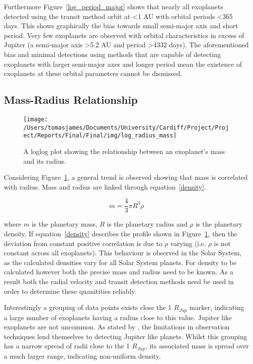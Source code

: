 \documentclass{report}
\begin{document}
Furthermore Figure~\ref{log_period_major} shows that nearly all exoplanets detected using the transit method orbit at \textless 1 AU with orbital periods \textless 365 days. This shows graphically the bias towards small semi-major axis and short period. Very few exoplanets are observed with orbital characteristics in excess of Jupiter (a semi-major axis \textgreater 5.2 AU and period \textgreater 4332 days). The aforementioned bias and minimal detections using methods that are capable of detecting exoplanets with larger semi-major axes and longer period mean the existence of exoplanets at these orbital parameters cannot be dismissed.

\subsection*{Mass-Radius Relationship}

\begin{figure}[H]
\centering
    \texttt{[image: /Users/tomasjames/Documents/University/Cardiff/Project/Project/Reports/Final/Final/img/log\_radius\_mass]}
\caption{A loglog plot showing the relationship between an exoplanet's mass and its radius.}\label{log_radius_mass}
\end{figure}

Considering Figure~\ref{log_radius_mass}, a general trend is observed showing that mass is correlated with radius. Mass and radius are linked through equation~\ref{density}.

\begin{equation} \label{density}
    m = \frac{4}{3}\pi R^3 \rho
\end{equation}

 where $m$ is the planetary mass, $R$ is the planetary radius and $\rho$ is the planetary density. If equation~\ref{density} describes the profile shown in Figure~\ref{log_radius_mass}, then the deviation from constant positive correlation is due to $\rho$ varying (i.e. $\rho$ is not constant across all exoplanets). This behaviour is observed in the Solar System, as the calculated densities vary for all Solar System planets. For density to be calculated however both the precise mass and radius need to be known. As a result both the radial velocity and transit detection methods need be used in order to determine these quanitities reliably.

 Interestingly a grouping of data points exists close the 1 $R_{Jup}$ marker, indicating a large number of exoplanets having a radius close to this value. Jupiter like exoplanets are not uncommon. As stated by \textcite{stats}, the limitations in observation techniques lend themselves to detecting Jupiter like planets. Whilst this grouping has a narrow spread of radii close to the 1 $R_{Jup}$, its associated mass is spread over a much larger range, indicating non-uniform density.
\end{document}
